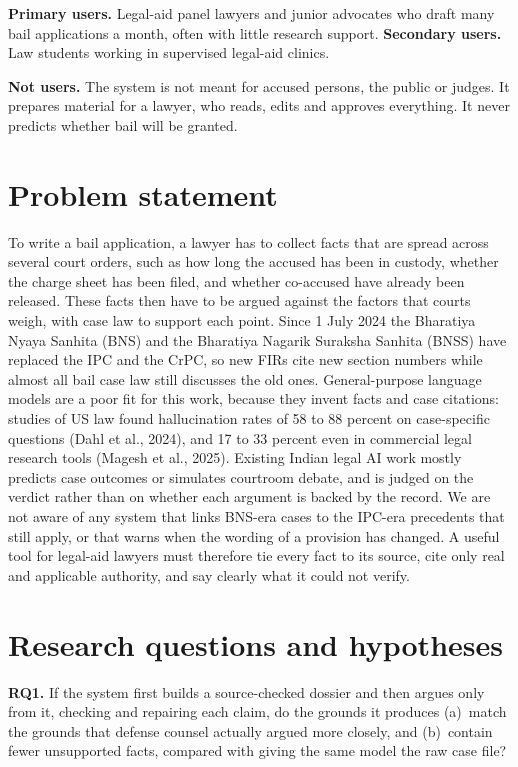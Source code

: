 \documentclass[11pt,a4paper]{article}
\begin{document}
\textbf{Primary users.} Legal-aid panel lawyers and junior advocates who draft many bail applications a month, often with little research support. \textbf{Secondary users.} Law students working in supervised legal-aid clinics.

\textbf{Not users.} The system is not meant for accused persons, the public or judges. It prepares material for a lawyer, who reads, edits and approves everything. It never predicts whether bail will be granted.

\section{Problem statement}

To write a bail application, a lawyer has to collect facts that are spread across several court orders, such as how long the accused has been in custody, whether the charge sheet has been filed, and whether co-accused have already been released. These facts then have to be argued against the factors that courts weigh, with case law to support each point. Since 1 July 2024 the Bharatiya Nyaya Sanhita (BNS) and the Bharatiya Nagarik Suraksha Sanhita (BNSS) have replaced the IPC and the CrPC, so new FIRs cite new section numbers while almost all bail case law still discusses the old ones. General-purpose language models are a poor fit for this work, because they invent facts and case citations: studies of US law found hallucination rates of 58 to 88 percent on case-specific questions (Dahl et al., 2024), and 17 to 33 percent even in commercial legal research tools (Magesh et al., 2025). Existing Indian legal AI work mostly predicts case outcomes or simulates courtroom debate, and is judged on the verdict rather than on whether each argument is backed by the record. We are not aware of any system that links BNS-era cases to the IPC-era precedents that still apply, or that warns when the wording of a provision has changed. A useful tool for legal-aid lawyers must therefore tie every fact to its source, cite only real and applicable authority, and say clearly what it could not verify.

\section{Research questions and hypotheses}

\textbf{RQ1.} If the system first builds a source-checked dossier and then argues only from it, checking and repairing each claim, do the grounds it produces (a)~match the grounds that defense counsel actually argued more closely, and (b)~contain fewer unsupported facts, compared with giving the same model the raw case file?
\end{document}
